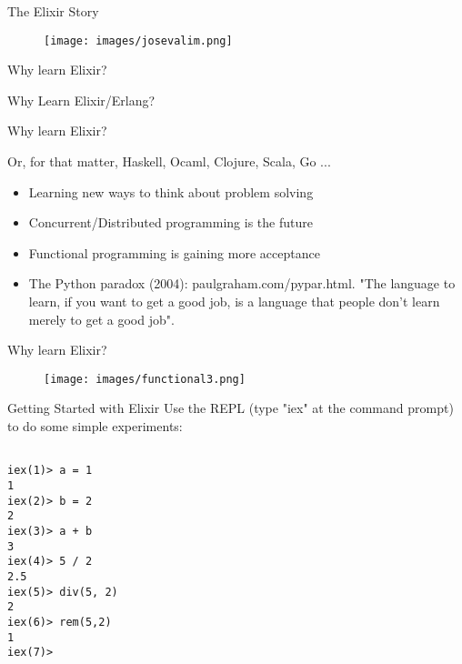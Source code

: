 \documentclass{beamer}
\begin{document}
\begin{frame}{The Elixir Story}

\begin{figure}
\texttt{[image: images/josevalim.png]}
\end{figure}

\end{frame}

\begin{frame}{Why learn Elixir?}

\begin{block}{}
Why Learn Elixir/Erlang?
\end{block}

\end{frame}
\begin{frame}{Why learn Elixir?}

Or, for that matter, Haskell, Ocaml, Clojure, Scala, Go ...

\begin{itemize}

\item Learning new ways to think about problem solving

\item Concurrent/Distributed programming is the future

\item Functional programming is gaining more acceptance

\item The Python paradox (2004): paulgraham.com/pypar.html. "The language to learn,
      if you want to get a good job, is a language that people don't learn merely to
      get a good job".

\end{itemize}
\end{frame}
 
\begin{frame}{Why learn Elixir?}

\begin{figure}
\texttt{[image: images/functional3.png]}
\end{figure}

\end{frame}

\begin{frame}[fragile]{Getting Started with Elixir}
Use the REPL (type "iex" at the command prompt) to do some simple experiments:

\begin{verbatim}

iex(1)> a = 1
1
iex(2)> b = 2
2
iex(3)> a + b
3
iex(4)> 5 / 2
2.5
iex(5)> div(5, 2)
2
iex(6)> rem(5,2)
1
iex(7)> 

\end{verbatim}

\end{frame}
\end{document}
